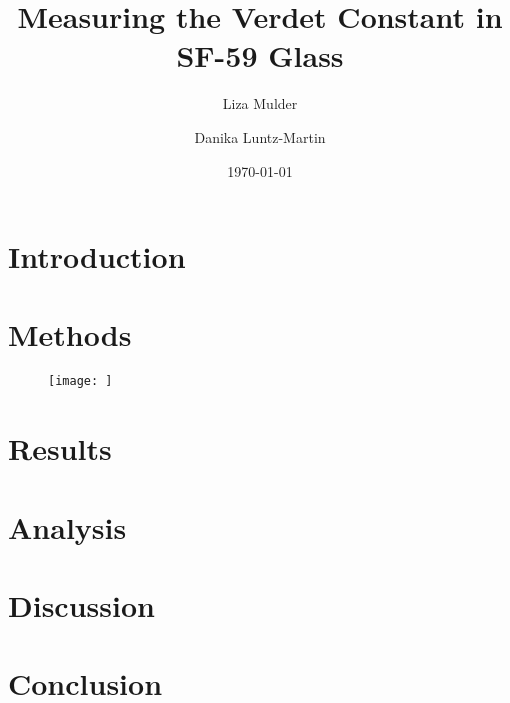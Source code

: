 \documentclass[prb,preprint]{revtex4-1}
\begin{document}

\title{Measuring the Verdet Constant in SF-59 Glass}


\author{Liza Mulder}


\author{Danika Luntz-Martin}


\date{\today}



\begin{abstract}



\end{abstract}

\maketitle %


\section{Introduction} %




\section{Methods}



\begin{figure}[h!]
\centering
\texttt{[image: ]}
\caption{}
\label{set-up}
\end{figure}





\section{Results}



\section{Analysis}

\section{Discussion}

\section{Conclusion}

 
\begin{thebibliography}{3}


\end{thebibliography}
\end{document}
